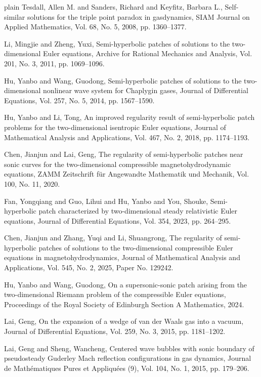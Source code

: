 \documentclass[3p,11pt]{elsarticle}
\numberwithin{equation}{section}
\begin{document}
\begin{thebibliography}{plain}
{Tesdall, Allen M. and Sanders, Richard and Keyfitz, Barbara L.,
Self-similar solutions for the triple point paradox in gasdynamics,
SIAM Journal on Applied Mathematics, Vol. 68, No. 5, 2008, pp. 1360--1377}.

{Li, Mingjie and Zheng, Yuxi,
Semi-hyperbolic patches of solutions to the two-dimensional Euler equations,
Archive for Rational Mechanics and Analysis, Vol. 201, No. 3, 2011, pp. 1069--1096}.

{Hu, Yanbo and Wang, Guodong,
Semi-hyperbolic patches of solutions to the two-dimensional nonlinear wave system for Chaplygin gases,
Journal of Differential Equations, Vol. 257, No. 5, 2014, pp. 1567--1590}.

{Hu, Yanbo and Li, Tong,
An improved regularity result of semi-hyperbolic patch problems for the two-dimensional isentropic Euler equations,
Journal of Mathematical Analysis and Applications, Vol. 467, No. 2, 2018, pp. 1174--1193}.

{Chen, Jianjun and Lai, Geng,
The regularity of semi-hyperbolic patches near sonic curves for the two-dimensional compressible magnetohydrodynamic equations,
ZAMM Zeitschrift f\"ur Angewandte Mathematik und Mechanik, Vol. 100, No. 11, 2020}.

{Fan, Yongqiang and Guo, Lihui and Hu, Yanbo and You, Shouke,
Semi-hyperbolic patch characterized by two-dimensional steady relativistic Euler equations,
Journal of Differential Equations, Vol. 354, 2023, pp. 264--295}.

{Chen, Jianjun and Zhang, Yuqi and Li, Shuangrong,
The regularity of semi-hyperbolic patches of solutions to the two-dimensional compressible Euler equations in magnetohydrodynamics,
Journal of Mathematical Analysis and Applications, Vol. 545, No. 2, 2025, Paper No. 129242}.

{Hu, Yanbo and Wang, Guodong,
On a supersonic-sonic patch arising from the two-dimensional Riemann problem of the compressible Euler equations,
Proceedings of the Royal Society of Edinburgh Section A Mathematics, 2024}.

{Lai, Geng,
On the expansion of a wedge of van der Waals gas into a vacuum,
Journal of Differential Equations, Vol. 259, No. 3, 2015, pp. 1181--1202}.

{Lai, Geng and Sheng, Wancheng,
Centered wave bubbles with sonic boundary of pseudosteady Guderley Mach reflection configurations in gas dynamics,
Journal de Math\'ematiques Pures et Appliqu\'ees (9), Vol. 104, No. 1, 2015, pp. 179--206}.
\end{thebibliography}
\end{document}
